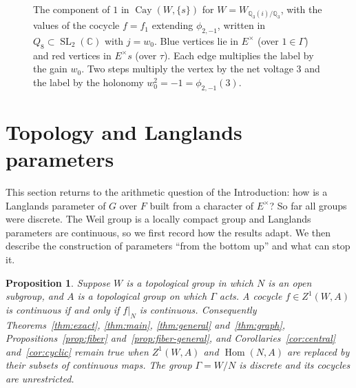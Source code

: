 \documentclass[12pt,letterpaper]{article}
\numberwithin{equation}{section}
\theoremstyle{plain}
\newtheorem{proposition}[theorem]{Proposition}
\theoremstyle{definition}
\newcommand{\C}{\mathbb{C}}
\newcommand{\Q}{\mathbb{Q}}
\DeclareMathOperator{\Hom}{Hom}
\DeclareMathOperator{\Cay}{Cay}
\DeclareMathOperator{\SL}{SL}
\begin{document}
\begin{figure}[ht]
\centering
{}
\caption{The component of $1$ in $\Cay(W,\{s\})$ for $W=W_{\Q_3(i)/\Q_3}$,
with the values of the cocycle $f=f_1$ extending $\phi_{2,-1}$, written in
$Q_8\subset\SL_2(\C)$ with $j=w_0$. Blue vertices lie in $E^\times$ (over
$1\in\Gamma$) and red vertices in $E^\times s$ (over $\tau$). Each edge
multiplies the label by the gain $w_0$. Two steps multiply the vertex by
the net voltage $3$ and the label by the holonomy
$w_0^2=-1=\phi_{2,-1}(3)$.}\label{fig:run}
\end{figure}

\section{Topology and Langlands parameters}\label{sec:langlands}

This section returns to the arithmetic question of the Introduction:
how is a Langlands parameter of $G$ over $F$ built from a character of
$E^\times$? So far all groups were discrete. The Weil group is a locally
compact group and Langlands parameters are continuous, so we first
record how the results adapt. We then describe the construction of
parameters ``from the bottom up'' and what can stop it.

\begin{proposition}\label{prop:cont}
Suppose $W$ is a topological group in which $N$ is an open subgroup, and
$A$ is a topological group on which $\Gamma$ acts. A cocycle
$f\in Z^1(W,A)$ is continuous if and only if $f|_N$ is continuous.
Consequently Theorems~\ref{thm:exact}, \ref{thm:main}, \ref{thm:general}
and~\ref{thm:graph}, Propositions~\ref{prop:fiber}
and~\ref{prop:fiber-general}, and
Corollaries~\ref{cor:central} and~\ref{cor:cyclic} remain true when
$Z^1(W,A)$ and $\Hom(N,A)$ are replaced by their subsets of continuous
maps. The group $\Gamma=W/N$ is discrete and its cocycles are unrestricted.
\end{proposition}
\end{document}
